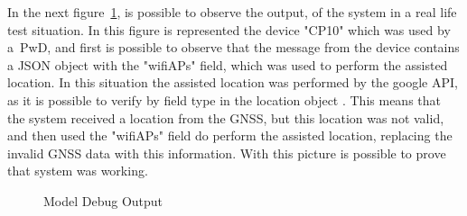 In the next figure~\ref{fig:node_red_debug}, is possible to observe the output, of the system in a real life test situation. In this figure is represented the device "CP10" which was used by a~\gls{PwD}, and first is possible to observe that the message from the device contains a JSON object with the "wifiAPs" field, which was used to perform the assisted location. In this situation the assisted location was performed by the google API, as it is possible to verify by field type in the location object . This means that the system received a location from the GNSS, but this location was not valid, and then used the "wifiAPs" field do perform the assisted location, replacing the invalid GNSS data with this information. With this picture is possible to prove that system was working.
\begin{figure}[htbp]
  \centering
  \caption{Model Debug Output}
  \label{fig:node_red_debug}
\end{figure}



